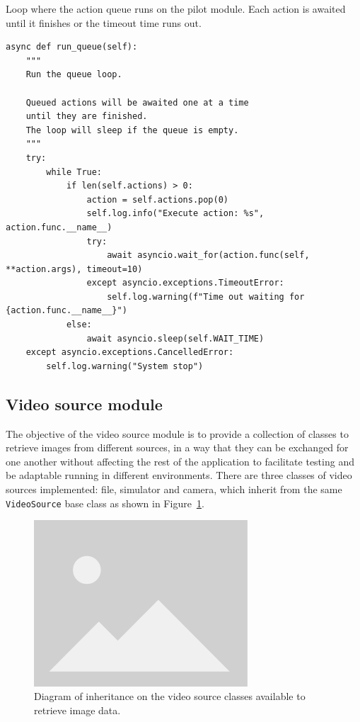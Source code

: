 \begin{listing}[h!]
    \caption{Loop where the action queue runs on the pilot module. Each action is awaited until it finishes or the timeout time runs out.}{}
    \label{lst:pilot.queue}
    \begin{verbatim}
async def run_queue(self):
    """
    Run the queue loop.
    
    Queued actions will be awaited one at a time
    until they are finished.
    The loop will sleep if the queue is empty.
    """
    try:
        while True:
            if len(self.actions) > 0:
                action = self.actions.pop(0)
                self.log.info("Execute action: %s", action.func.__name__)
                try:
                    await asyncio.wait_for(action.func(self, **action.args), timeout=10)
                except asyncio.exceptions.TimeoutError:
                    self.log.warning(f"Time out waiting for {action.func.__name__}")
            else:
                await asyncio.sleep(self.WAIT_TIME)
    except asyncio.exceptions.CancelledError:
        self.log.warning("System stop")
    \end{verbatim}
\end{listing}

\subsection{Video source module}

The objective of the video source module is to provide a collection of classes to retrieve images from different sources,
in a way that they can be exchanged for one another without affecting the rest of the application to facilitate testing and be adaptable running in different environments.
There are three classes of video sources implemented: file, simulator and camera, which inherit from the same \texttt{VideoSource} base class as shown in Figure~\ref{fig:video-source-inheritance}.

\begin{figure}
  \centering
  \includegraphics[width=8cm, keepaspectratio]{img/placeholder.png}
  \caption{Diagram of inheritance on the video source classes available to retrieve image data.}\label{fig:video-source-inheritance}
\end{figure}

